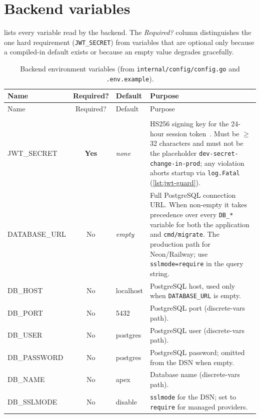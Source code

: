 \section{Backend variables}

 lists every variable read by the backend. The \emph{Required?} column distinguishes the one hard requirement (\texttt{JWT\_SECRET}) from variables that are optional only because a compiled-in default exists or because an empty value degrades gracefully.

\begin{center}
\begin{xltabular}{\linewidth}{>{\ttfamily\small}p{3.5cm} c >{\ttfamily\footnotesize}p{2.9cm} X}
  \caption{Backend environment variables (from \texttt{internal/config/config.go} and \texttt{.env.example}).}\label{tab:ap-c-backend}\\
  \toprule
  \normalfont Name & \normalfont Required? & \normalfont Default & \normalfont Purpose \\
  \midrule
  \endfirsthead
  \toprule
  \normalfont Name & \normalfont Required? & \normalfont Default & \normalfont Purpose \\
  \midrule
  \endhead
  \midrule
  \\
  \endfoot
  \bottomrule
  \endlastfoot

  JWT\_SECRET & \textbf{Yes} & \normalfont\itshape none &
  HS256 signing key for the 24-hour session token~\cite{rfc7519}. Must be $\geq$32 characters and must not be the placeholder \texttt{dev-secret-change-in-prod}; any violation aborts startup via \texttt{log.Fatal} (\cref{lst:jwt-guard}). \\

  DATABASE\_URL & No & \normalfont\itshape empty &
  Full PostgreSQL connection URL. When non-empty it takes precedence over every \texttt{DB\_*} variable for both the application and \texttt{cmd/migrate}. The production path for Neon/Railway; use \texttt{sslmode=require} in the query string. \\

  DB\_HOST & No & localhost & PostgreSQL host, used only when \texttt{DATABASE\_URL} is empty. \\
  DB\_PORT & No & 5432 & PostgreSQL port (discrete-vars path). \\
  DB\_USER & No & postgres & PostgreSQL user (discrete-vars path). \\
  DB\_PASSWORD & No & postgres & PostgreSQL password; omitted from the DSN when empty. \\
  DB\_NAME & No & apex & Database name (discrete-vars path). \\
  DB\_SSLMODE & No & disable & \texttt{sslmode} for the DSN; set to \texttt{require} for managed providers. \\


\end{xltabular}
\end{center}
